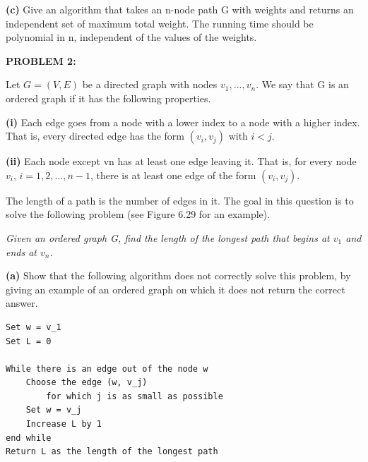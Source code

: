 \documentclass[11pt]{article}
\begin{document}
\vspace{2mm}

\noindent \textbf{(c)}  Give an algorithm that takes an n-node path G with weights and returns an independent set of maximum total weight. The running time should be polynomial in n, independent of the values of the weights.

\vspace{6mm}

\noindent \textbf{PROBLEM 2:} 

\vspace{2mm}

\noindent Let $G = (V, E)$ be a directed graph with nodes $v_1, ..., v_n$. We say that G is an ordered graph if it has the following properties. 

\vspace{2mm}

\textbf{(i)} Each edge goes from a node with a lower index to a node with a higher index. That is, every directed edge has the form $(v_i, v_j)$ with $i < j$. 

\vspace{2mm}

\textbf{(ii)} Each node except vn has at least one edge leaving it. That is, for every node $v_i$, $i = 1, 2, ..., n − 1$, there is at least one edge of the form $(v_i,v_j)$. 

\vspace{2mm}

The length of a path is the number of edges in it. The goal in this question is to solve the following problem (see Figure 6.29 for an example).

\vspace{2mm}

\emph{Given an ordered graph G, find the length of the longest path that begins at $v_1$ and ends at $v_n$.}

\vspace{2mm}

\noindent \textbf{(a)} Show that the following algorithm does not correctly solve this problem, by giving an example of an ordered graph on which it does not return the correct answer.

\begin{lstlisting}
Set w = v_1
Set L = 0

While there is an edge out of the node w 
	Choose the edge (w, v_j) 
		for which j is as small as possible 
	Set w = v_j 	
	Increase L by 1 
end while 
Return L as the length of the longest path

\end{lstlisting}
\end{document}

